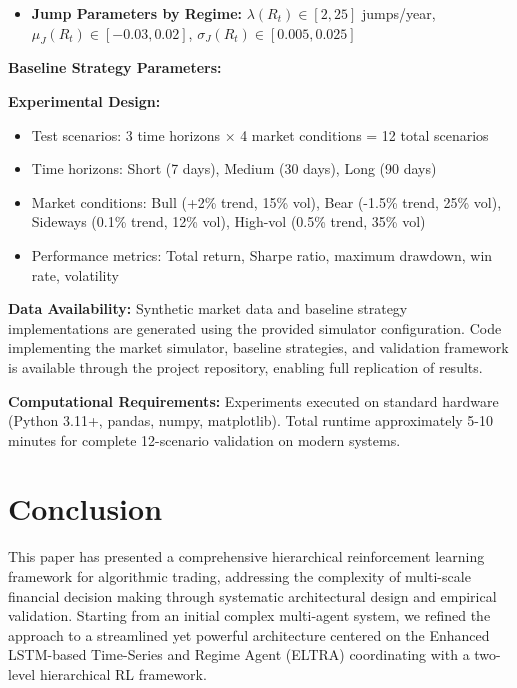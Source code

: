 \documentclass[11pt,a4paper]{article}
\begin{document}
\begin{itemize}
\item \textbf{Jump Parameters by Regime:} $\lambda(R_t) \in [2, 25]$ jumps/year, $\mu_J(R_t) \in [-0.03, 0.02]$, $\sigma_J(R_t) \in [0.005, 0.025]$

\end{itemize}
\textbf{Baseline Strategy Parameters:}
\textbf{Experimental Design:}
\begin{itemize}
\item Test scenarios: 3 time horizons × 4 market conditions = 12 total scenarios
\item Time horizons: Short (7 days), Medium (30 days), Long (90 days)
\item Market conditions: Bull (+2\% trend, 15\% vol), Bear (-1.5\% trend, 25\% vol), Sideways (0.1\% trend, 12\% vol), High-vol (0.5\% trend, 35\% vol)
\item Performance metrics: Total return, Sharpe ratio, maximum drawdown, win rate, volatility

\end{itemize}
\textbf{Data Availability:}
Synthetic market data and baseline strategy implementations are generated using the provided simulator configuration. Code implementing the market simulator, baseline strategies, and validation framework is available through the project repository, enabling full replication of results.

\textbf{Computational Requirements:}
Experiments executed on standard hardware (Python 3.11+, pandas, numpy, matplotlib). Total runtime approximately 5-10 minutes for complete 12-scenario validation on modern systems.

\section{Conclusion}

This paper has presented a comprehensive hierarchical reinforcement learning framework for algorithmic trading, addressing the complexity of multi-scale financial decision making through systematic architectural design and empirical validation. Starting from an initial complex multi-agent system, we refined the approach to a streamlined yet powerful architecture centered on the Enhanced LSTM-based Time-Series and Regime Agent (ELTRA) coordinating with a two-level hierarchical RL framework.
\end{document}
